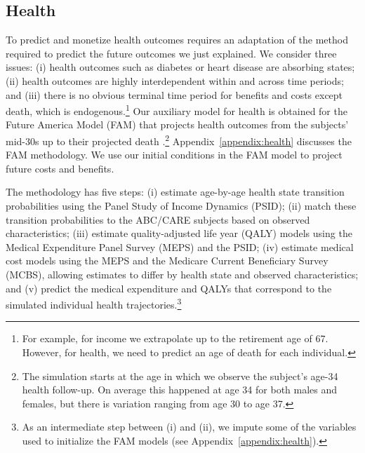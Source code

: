 \subsection{Health} \label{section:health}

To predict and monetize health outcomes requires an adaptation of the method required to predict the future outcomes we just explained. We consider three issues: (i) health outcomes such as diabetes or heart disease are absorbing states; (ii) health outcomes are highly interdependent within and across time periods; and (iii) there is no obvious terminal time period for benefits and costs except death, which is endogenous.\footnote{For example, for income we extrapolate up to the retirement age of 67. However, for health, we need to predict an age of death for each individual.} Our auxiliary model for health is obtained for the Future America Model (FAM) that projects health outcomes from the subjects' mid-30s up to their projected death \citep{Goldman_etal_2015_Future-Elderly-Model-Report}.\footnote{The simulation starts at the age in which we observe the subject's age-34 health follow-up. On average this happened at age 34 for both males and females, but there is variation ranging from age 30 to age 37.} Appendix~\ref{appendix:health} discusses the FAM methodology. We use our initial conditions in the FAM model to project future costs and benefits.

The methodology has five steps: (i) estimate age-by-age health state transition probabilities using the Panel Study of Income Dynamics (PSID); (ii) match these transition probabilities to the ABC/CARE subjects based on observed characteristics; (iii) estimate quality-adjusted life year (QALY) models using the Medical Expenditure Panel Survey (MEPS) and the PSID; (iv) estimate medical cost models using the MEPS and the Medicare Current Beneficiary Survey (MCBS), allowing estimates to differ by health state and observed characteristics; and (v) predict the medical expenditure and QALYs that correspond to the simulated individual health trajectories.\footnote{As an intermediate step between (i) and (ii), we impute some of the variables used to initialize the FAM models (see Appendix~\ref{appendix:health}).}

